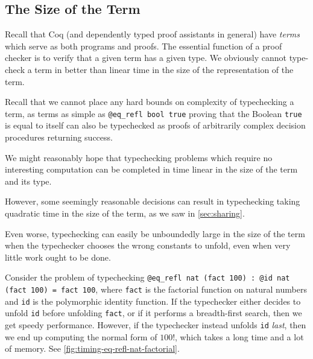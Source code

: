 \subsection{The Size of the Term}

Recall that Coq (and dependently typed proof assistants in general) have \emph{terms} which serve as both programs and proofs.
The essential function of a proof checker is to verify that a given term has a given type.
We obviously cannot type-check a term in better than linear time in the size of the representation of the term.

Recall that we cannot place any hard bounds on complexity of typechecking a term, as terms as simple as \texttt{@eq_refl bool true} proving that the Boolean \texttt{true} is equal to itself can also be typechecked as proofs of arbitrarily complex decision procedures returning success.

We might reasonably hope that typechecking problems which require no interesting computation can be completed in time linear in the size of the term and its type.

However, some seemingly reasonable decisions can result in typechecking taking quadratic time in the size of the term, as we saw in \autoref{sec:sharing}.

%

Even worse, typechecking can easily be unboundedly large in the size of the term when the typechecker chooses the wrong constants to unfold, even when very little work ought to be done.

%

Consider the problem of typechecking \texttt{@eq_refl nat (fact 100) : @id nat (fact 100) = fact 100}, where \texttt{fact} is the factorial function on natural numbers and \texttt{id} is the polymorphic identity function.
%
If the typechecker either decides to unfold \texttt{id} before unfolding \texttt{fact}, or if it performs a breadth-first search, then we get speedy performance.
However, if the typechecker instead unfolds \texttt{id} \emph{last}, then we end up computing the normal form of $100!$, which takes a long time and a lot of memory.
See \autoref{fig:timing-eq-refl-nat-factorial}.

